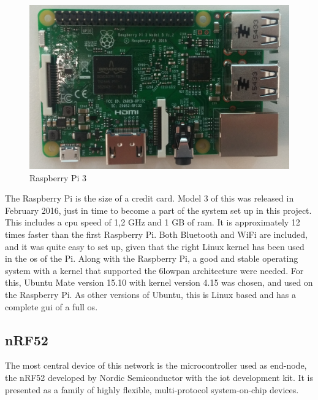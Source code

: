 \begin{figure}[ht]
    \centering
    \includegraphics[scale=0.35]{pi3.png}    
    \caption{Raspberry Pi 3}
    \label{fig:piPicture}
\end{figure}

\noindent The Raspberry Pi is the size of a credit card. Model 3 of this was released in February 2016, just in time to become a part of the system set up in this project. This includes a \gls{cpu} speed of 1,2 GHz and 1 GB of \gls{ram}. It is approximately 12 times faster than the first Raspberry Pi. Both Bluetooth and WiFi are included, and it was quite easy to set up, given that the right Linux kernel has been used in the \gls{os} of the Pi. Along with the Raspberry Pi, a good and stable operating system with a kernel that supported the \gls{6lowpan} architecture were needed. For this, Ubuntu Mate version 15.10 with kernel version 4.15 was chosen, and used on the Raspberry Pi. As other versions of Ubuntu, this is Linux based and has a complete \gls{gui} of a full \gls{os}. %

\subsection{nRF52}

\noindent The most central device of this network is the \gls{microcontroller} used as end-node, the nRF52 developed by Nordic Semiconductor with the \gls{iot} development kit. It is presented as a family of highly flexible, multi-protocol system-on-chip devices\cite{nord}. 


